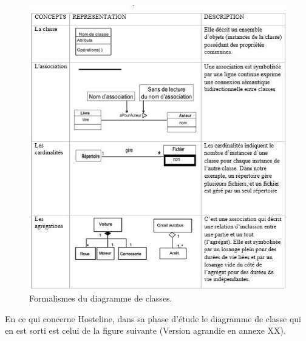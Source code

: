 \begin{figure}[!htbp]
	\begin{center}
		\includegraphics[scale=0.95]{images/form_classe.png}
		\caption{Formalismes du diagramme de classes.}
		\label{use_case_summary}
	\end{center}
\end{figure}
\cleardoublepage
En ce qui concerne Hosteline, dans sa phase d’étude le diagramme de classe qui en est sorti est celui de la figure suivante (Version agrandie en annexe XX).

